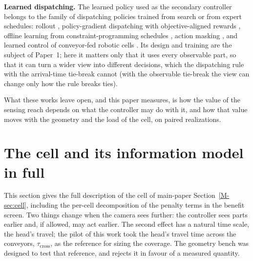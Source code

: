 \documentclass[11pt,a4paper]{article}
\newcommand{\tcross}{\tau_{\mathrm{cross}}}
\begin{document}
\textbf{Learned dispatching.} The learned policy used as the secondary controller
belongs to the family of dispatching policies trained from search or from expert
schedules: rollout \cite{M02_Bertsekas1997}, policy-gradient dispatching with
objective-aligned rewards \cite{S19_Zhang2020,S21_Sun2023}, offline learning from
constraint-programming schedules \cite{S20_VanRemmerden2025}, action masking
\cite{M04_Huang2022,S18_Wei2024}, and learned control of conveyor-fed robotic cells
\cite{S15_Zisgen2025,S16_Drijver2023,S17_Drakaki2017,S12_Wang2004,S13_Li2020}. Its
design and training are the subject of Paper~1; here it matters only that it uses every
observable part, so that it can turn a wider view into different decisions, which the
dispatching rule with the arrival-time tie-break cannot (with the observable tie-break the
view can change only how the rule breaks ties).

What these works leave open, and this paper measures, is how the value of the sensing
reach depends on what the controller may do with it, and how that value moves with the
geometry and the load of the cell, on paired realizations.

\section{The cell and its information model in full}\label{sup:cell}
This section gives the full description of the cell of main-paper
Section~\ref{M-sec:cell}, including the per-cell decomposition of the penalty terms in
the benefit screen. Two things change when the camera sees further: the controller sees
parts earlier and, if allowed, may act earlier. The second effect has a natural time
scale, the head's travel; the pilot of this work took the head's travel time across the
conveyors, $\tcross$, as the reference for sizing the coverage. The geometry bench was
designed to test that reference, and rejects it in favour of a measured quantity.
\end{document}
